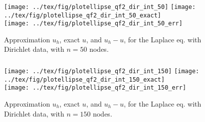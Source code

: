 \documentclass[handout]{beamer}
\begin{document}
\begin{frame}
 \frametitle{}
\begin{center}
\begin{figure}
{
\texttt{[image: ../tex/fig/plotellipse\_qf2\_dir\_int\_50]}
}
{
\texttt{[image: ../tex/fig/plotellipse\_qf2\_dir\_int\_50\_exact]}
}
\\
\centering
{
\texttt{[image: ../tex/fig/plotellipse\_qf2\_dir\_int\_50\_err]}
}
\caption{Approximation $u_h$, exact $u$, and $u_h - u$, for the Laplace eq. 
with Dirichlet data, with $n=50$ nodes.}
\label{fig:ellipse_qf2_50}
\end{figure}
\end{center}
\end{frame}
\begin{frame}
 \frametitle{}
\begin{center}
\begin{figure}
{
\texttt{[image: ../tex/fig/plotellipse\_qf2\_dir\_int\_150]}
}
{
\texttt{[image: ../tex/fig/plotellipse\_qf2\_dir\_int\_150\_exact]}
}
\\
\centering
{
\texttt{[image: ../tex/fig/plotellipse\_qf2\_dir\_int\_150\_err]}
}
\caption{Approximation $u_h$, exact $u$, and $u_h - u$, for the Laplace eq. 
with Dirichlet data, with $n=150$ nodes.}
\label{fig:ellipse_qf2_150}
\end{figure}
\end{center}
\end{frame}
\end{document}

